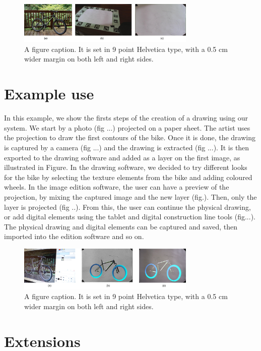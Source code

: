 \documentclass{article}
\begin{document}
\begin{figure}[t]
\includegraphics[width = 85mm]{fig1.pdf}
\caption{A figure caption.  It is set in 9 point Helvetica type, with a
0.5 cm wider margin on both left and right sides.} 
\label{fig:1}
\end{figure}

\section{Example use}

In this example, we show the firsts steps of the creation of a drawing using our system. We start by a photo (fig ...) projected on a paper sheet. The artist uses the projection to draw the first contours of the bike. Once it is done, the drawing is captured by a camera (fig ...) and the drawing is extracted (fig ...). It is then exported to the drawing software and added as a layer on the first image, as illustrated in Figure. 
In the drawing software, we decided to try different looks for the bike by selecting the texture elements from the bike and adding coloured wheels. In the image edition software, the user can have a preview of the projection, by mixing the captured image and the new layer (fig.). Then, only the layer is projected  (fig ..). From this, the user can continue the physical drawing, or add digital elements using the tablet and digital construction line tools (fig...). The physical drawing and digital elements can be captured and saved, then imported into the edition software and so on. 

\begin{figure}[b]
\includegraphics[width = 85mm]{fig2.pdf}
\caption{A figure caption.  It is set in 9 point Helvetica type, with a
0.5 cm wider margin on both left and right sides.} 
\label{fig:2}
\end{figure}

\section{Extensions}
\end{document}
